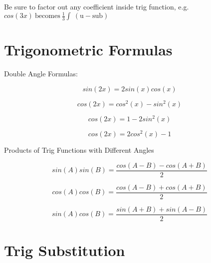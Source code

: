 \documentclass{article}
\begin{document}
\centerline{Be sure to factor out any coefficient inside trig function, e.g. $ cos(3x) \: \mathrm{becomes} \: \frac{1}{3}\int~ (\mathrm{u-sub})$}






\section{Trigonometric Formulas}

\begin{multicols}{2}


\centerline{Double Angle Formulas:}

\medskip{}

$$sin(2x) = 2 sin(x) cos(x)$$

$$cos(2x) = cos^2(x) - sin^2(x)$$

$$cos(2x) = 1 - 2sin^2(x)$$

$$cos(2x) = 2cos^2(x) - 1$$

\centerline{Products of Trig Functions with Different Angles}

$$sin(A)sin(B) = \frac{cos(A-B) - cos(A + B)}{2}$$

$$cos(A)cos(B) = \frac{cos(A-B) + cos(A + B)}{2}$$

$$sin(A)cos(B) = \frac{sin(A + B) + sin(A - B)}{2}$$

\end{multicols}




\section{Trig Substitution}
\end{document}
